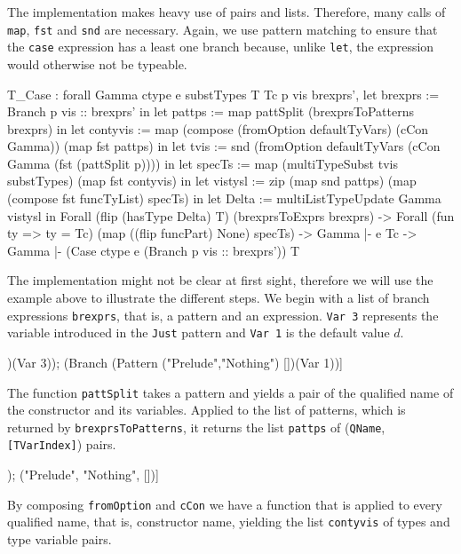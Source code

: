 \documentclass[paper = a4, fleqn, abstract=on, twoside]{scrreprt}
\newcommand{\todo}[1]{\marginpar{\textbf{TODO:} #1}}
\newcommand{\coqinline}[1]{\texttt{#1}}
\begin{document}
The implementation makes heavy use of pairs and lists. Therefore, many calls of \coqinline{map}, \coqinline{fst} and \coqinline{snd} are necessary. Again, we use pattern matching to ensure that the \texttt{case} expression has a least one branch because, unlike \texttt{let}, the expression would otherwise not be typeable.
\todo{CamelCase im Code}
\begin{coqcode}
T_Case : forall Gamma ctype e substTypes T Tc p vis brexprs',
           let  brexprs := Branch p vis :: brexprs' in
           let   pattps := map pattSplit (brexprsToPatterns brexprs) in
           let contyvis := map (compose (fromOption defaultTyVars) (cCon Gamma))
                               (map fst pattps) in
           let     tvis := snd (fromOption defaultTyVars (cCon Gamma (fst (pattSplit p)))) in
           let   specTs := map (multiTypeSubst tvis substTypes)
                               (map fst contyvis) in
           let  vistysl := zip (map snd pattps)
                               (map (compose fst funcTyList) specTs) in
           let    Delta := multiListTypeUpdate Gamma vistysl
            in Forall (flip (hasType Delta) T) (brexprsToExprs brexprs) ->
               Forall (fun ty => ty = Tc) (map ((flip funcPart) None) specTs) ->
               Gamma |- e \in Tc ->
         Gamma |- (Case ctype e (Branch p vis :: brexprs')) \in T
\end{coqcode}
The implementation might not be clear at first sight, therefore we will use the example above to illustrate the different steps. We begin with a list of branch expressions \texttt{brexprs}, that is, a pattern and an expression. \texttt{Var 3} represents the variable introduced in the \texttt{Just} pattern and \texttt{Var 1} is the default value $d$.
\begin{coqcode}
[(Branch (Pattern ("Prelude","Just")   [3])(Var 3));
 (Branch (Pattern ("Prelude","Nothing") [])(Var 1))]
\end{coqcode}
The function \coqinline{pattSplit} takes a pattern and yields a pair of the qualified name of the constructor and its variables. Applied to the list of patterns, which is returned by \coqinline{brexprsToPatterns}, it returns the list \texttt{pattps} of (\coqinline{QName}, \coqinline{[TVarIndex]}) pairs.
\begin{coqcode}
[("Prelude", "Just", [3]); ("Prelude", "Nothing", [])]
\end{coqcode}
By composing \coqinline{fromOption} and \coqinline{cCon} we have a function that is applied to every qualified name, that is, constructor name, yielding the list \texttt{contyvis} of types and type variable pairs.
\end{document}
